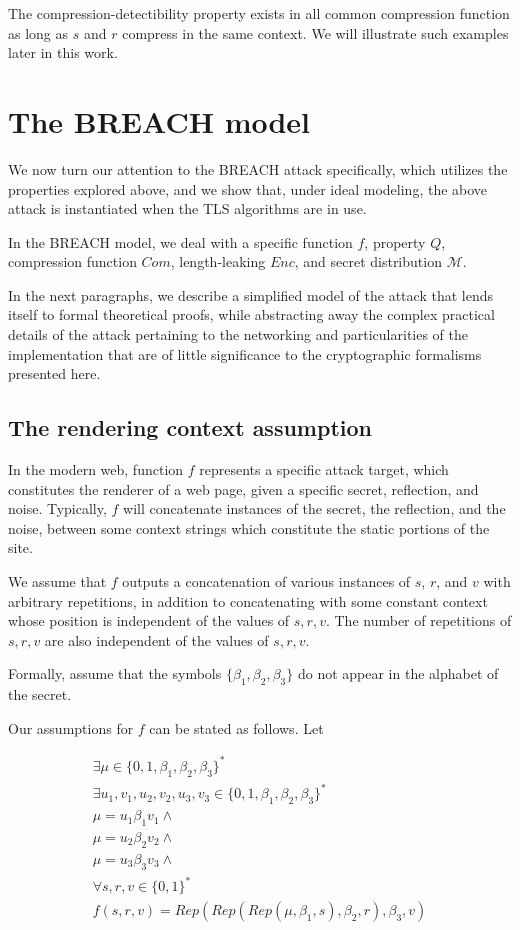 \documentclass{article}
\begin{document}
The compression-detectibility property exists in all common compression
function as long as $s$ and $r$ compress in the same context. We will
illustrate such examples later in this work.

\section{The BREACH model}
We now turn our attention to the BREACH attack specifically, which utilizes
the properties explored above, and we show that, under ideal modeling,
the above attack is instantiated when the TLS algorithms are in use.

In the BREACH model, we deal with a specific function $f$, property $Q$,
compression function $Com$, length-leaking $Enc$, and secret distribution
$\mathcal{M}$.

In the next paragraphs, we describe a simplified model of the attack that
lends itself to formal theoretical proofs, while abstracting away the complex
practical details of the attack pertaining to the networking and particularities
of the implementation that are of little significance to the cryptographic
formalisms presented here.

\subsection{The rendering context assumption}

In the modern web, function $f$ represents a specific attack target, which
constitutes the renderer of a web page, given a specific secret, reflection,
and noise. Typically, $f$ will concatenate instances of the secret, the
reflection, and the noise, between some context strings which constitute the
static portions of the site.

We assume that $f$ outputs a concatenation of various instances of $s$, $r$,
and $v$ with arbitrary repetitions, in addition to concatenating with some
constant context whose position is independent of the values of $s, r, v$.  The
number of repetitions of $s, r, v$ are also independent of the values of $s, r,
v$.

Formally, assume that the symbols $\{\beta_1, \beta_2, \beta_3\}$ do not appear in the
alphabet of the secret.

Our assumptions for $f$ can be stated as follows. Let

\begin{equation*}
\begin{split}
\exists \mu \in \{0, 1, \beta_1, \beta_2, \beta_3\}^*\\
\exists u_1, v_1, u_2, v_2, u_3, v_3 \in \{0, 1, \beta_1, \beta_2, \beta_3\}^*\\
\mu = u_1 \beta_1 v_1 \land\\
\mu = u_2 \beta_2 v_2 \land\\
\mu = u_3 \beta_3 v_3 \land\\
\forall s, r, v \in \{0, 1\}^*\\
f(s, r, v) = Rep(Rep(Rep(\mu, \beta_1, s), \beta_2, r), \beta_3, v)
\end{split}
\end{equation*}
\end{document}
